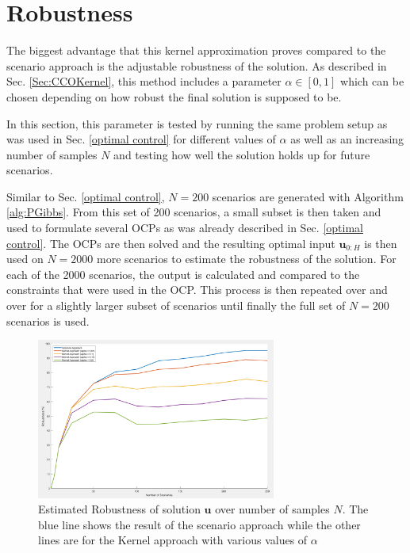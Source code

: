 \section{Robustness} \label{performance guarantees}

The biggest advantage that this kernel approximation proves compared to the scenario approach is the adjustable robustness of the solution. As described in Sec. \ref{Sec:CCOKernel}, this method includes a parameter $\alpha \in [0, 1]$ which can be chosen depending on how robust the final solution is supposed to be. 

In this section, this parameter is tested by running the same problem setup as was used in Sec. \ref{optimal control} for different values of $\alpha$ as well as an increasing number of samples $N$ and testing how well the solution holds up for future scenarios.

Similar to Sec. \ref{optimal control}, $N = 200$ scenarios are generated with Algorithm \ref{alg:PGibbs}. From this set of 200 scenarios, a small subset is then taken and used to formulate several OCPs as was already described in Sec. \ref{optimal control}. The OCPs are then solved and the resulting optimal input $\boldsymbol{u}_{0:H}$ is then used on $N = 2000$ more scenarios to estimate the robustness of the solution. For each of the 2000 scenarios, the output is calculated and compared to the constraints that were used in the OCP. This process is then repeated over and over for a slightly larger subset of scenarios until finally the full set of $N = 200$ scenarios is used.

\begin{figure}[htb]
\centering
\includegraphics[width=0.7\textwidth]{pics/robustness_plot.png}
\caption{Estimated Robustness of solution $\boldsymbol{u}$ over number of samples $N$. The blue line shows the result of the scenario approach while the other lines are for the Kernel approach with various values of $\alpha$}
\label{fig:robustness_plot}
\end{figure}


